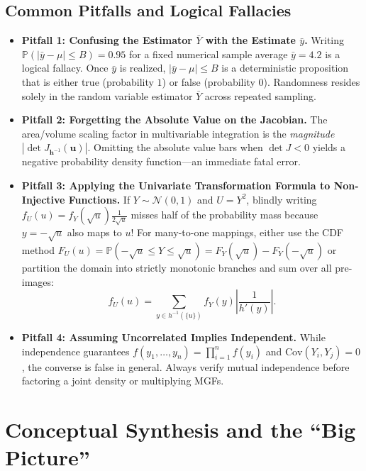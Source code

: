 \documentclass[11pt, letterpaper]{article}
\theoremstyle{definition}
\theoremstyle{remark}
\newcommand{\Prob}{\mathbb{P}}
\begin{document}
\subsection{Common Pitfalls and Logical Fallacies}

\begin{itemize}
    \item \textbf{Pitfall 1: Confusing the Estimator $\bar{Y}$ with the Estimate $\bar{y}$.} Writing $\Prob(|\bar{y} - \mu| \le B) = 0.95$ for a fixed numerical sample average $\bar{y} = 4.2$ is a logical fallacy. Once $\bar{y}$ is realized, $|\bar{y} - \mu| \le B$ is a deterministic proposition that is either true (probability $1$) or false (probability $0$). Randomness resides solely in the random variable estimator $\bar{Y}$ across repeated sampling.
    \item \textbf{Pitfall 2: Forgetting the Absolute Value on the Jacobian.} The area/volume scaling factor in multivariable integration is the \emph{magnitude} $|\det J_{\mathbf{h}^{-1}}(\mathbf{u})|$. Omitting the absolute value bars when $\det J < 0$ yields a negative probability density function—an immediate fatal error.
    \item \textbf{Pitfall 3: Applying the Univariate Transformation Formula to Non-Injective Functions.} If $Y \sim \mathcal{N}(0, 1)$ and $U = Y^2$, blindly writing $f_U(u) = f_Y(\sqrt{u}) \frac{1}{2\sqrt{u}}$ misses half of the probability mass because $y = -\sqrt{u}$ also maps to $u$! For many-to-one mappings, either use the CDF method $F_U(u) = \Prob(-\sqrt{u} \le Y \le \sqrt{u}) = F_Y(\sqrt{u}) - F_Y(-\sqrt{u})$ or partition the domain into strictly monotonic branches and sum over all pre-images:
    \[
        f_U(u) = \sum_{y \in h^{-1}(\{u\})} f_Y(y) \left|\frac{1}{h'(y)}\right|.
    \]
    \item \textbf{Pitfall 4: Assuming Uncorrelated Implies Independent.} While independence guarantees $f(y_1, \dots, y_n) = \prod_{i=1}^n f(y_i)$ and $\text{Cov}(Y_i, Y_j) = 0$, the converse is false in general. Always verify mutual independence before factoring a joint density or multiplying MGFs.
\end{itemize}

\newpage

\section{Conceptual Synthesis and the ``Big Picture''}
\end{document}
